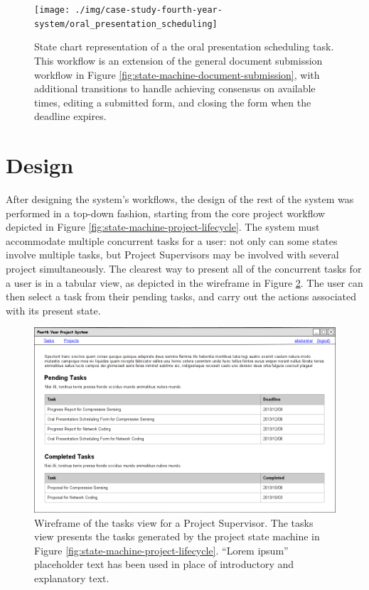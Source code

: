 \documentclass[document.tex]{subfiles}
\begin{document}
\begin{figure}[!htbp]
\centering \texttt{[image: ./img/case-study-fourth-year-system/oral\_presentation\_scheduling]}
\caption{State chart representation of a the oral presentation scheduling task. This workflow is an extension of the general document submission workflow in Figure \ref{fig:state-machine-document-submission}, with additional transitions to handle achieving consensus on available times, editing a submitted form, and closing the form when the deadline expires.}
\label{fig:state-machine-oral-presentation-scheduling}
\end{figure}


\FloatBarrier

\section{Design}
\label{sec:4ys-design}

After designing the system's workflows, the design of the rest of the system was performed in a top-down fashion, starting from the core project workflow depicted in Figure \ref{fig:state-machine-project-lifecycle}. The system must accommodate multiple concurrent tasks for a user: not only can some states involve multiple tasks, but Project Supervisors may be involved with several project simultaneously. The clearest way to present all of the concurrent tasks for a user is in a tabular view, as depicted in the wireframe in Figure \ref{fig:wireframe-tasks-view}. The user can then select a task from their pending tasks, and carry out the actions associated with its present state.

\begin{figure}[!htbp]
\centering \includegraphics[width=6in]{./img/case-study-fourth-year-system/supervisor-tasks-view_wireframe}
\caption{Wireframe of the tasks view for a Project Supervisor. The tasks view presents the tasks generated by the project state machine in Figure \ref{fig:state-machine-project-lifecycle}. ``Lorem ipsum'' placeholder text has been used in place of introductory and explanatory text.}
\label{fig:wireframe-tasks-view}
\end{figure}
\end{document}
